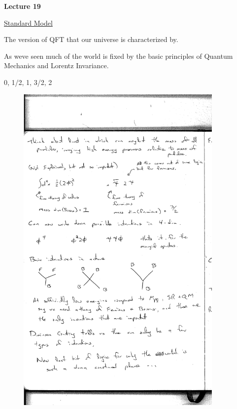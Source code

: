 



\thispagestyle{fancy}

\begin{center}
{\huge \textbf{Lecture 19}}
\end{center}

{\fontsize{14}{16}\selectfont

\underline{Standard Model}

The version of QFT that our universe is characterized by.

As weve seen much of the world is fixed by the basic principles of Quantum Mechanics and Lorentz Invariance.

\begin{center}
0, 1/2, 1, 3/2, 2  
\end{center}

\begin{figure}[h]
\centering
\includegraphics[width=0.9\textwidth]{../Week5_Lagrangians/Interactions.pdf}
\end{figure}

}
